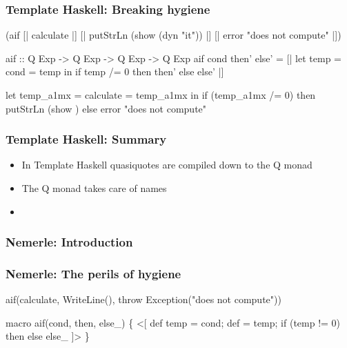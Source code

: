 \documentclass[svgnames,hyperref={bookmarks=false}]{beamer}
\begin{document}
\begin{frame}[fragile]
\frametitle{Template Haskell: Breaking hygiene}
\begin{semiverbatim}
{\textdollar}(aif [| calculate |]
  [| putStrLn (show \alert{{\textdollar}(dyn "it")}) |]
  [| error "does not compute" |])

aif :: Q Exp -> Q Exp -> Q Exp -> Q Exp
aif cond then' else' =
  [| let temp = {\textdollar}cond
         \text{\color{red}{it}} = temp
     in if temp /= 0 then {\textdollar}then' else {\textdollar}else' |]

let temp_a1mx = calculate
    \text{\color{red}{it_a1my}} = temp_a1mx
in if (temp_a1mx /= 0)
   then putStrLn (show \text{\color{blue}{it_a1my}})
   else error "does not compute"
\end{semiverbatim}
\end{frame}

\begin{frame}[fragile]
\frametitle{Template Haskell: Summary}
\begin{itemize}
\item In Template Haskell quasiquotes are compiled down to the Q monad
\item The Q monad takes care of names
\item \text{\color{blue}{Sometimes we need to break hygiene}}
\end{itemize}
\end{frame}

\begin{frame}[fragile]
\frametitle<1>{Nemerle: Introduction}
\frametitle<2>{Nemerle: The perils of hygiene}
\begin{semiverbatim}
aif(calculate,
  WriteLine(),
  throw Exception("does not compute"))

macro aif(cond, then, else_) \{
  <[
    def temp = {\textdollar}cond;
    def  = temp;
    if (temp != 0) {\textdollar}then else {\textdollar}else_
  ]>
\}
\end{semiverbatim}

\end{frame}
\end{document}
